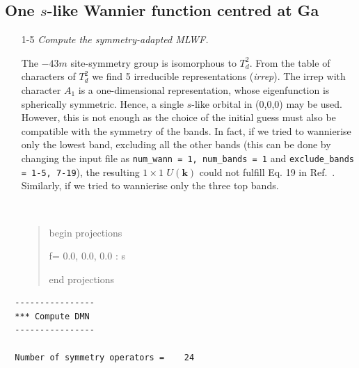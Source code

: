 \subsection*{One $s$-like Wannier function centred at Ga}
\begin{itemize}
	\item[1-5] {\it  Compute the symmetry-adapted MLWF.}

	The ${-}43m$ site-symmetry group is isomorphous to $T_d^2$. From the table of characters of $T_d^2$ we find 5 irreducible representations (\textit{irrep}). The irrep with character $A_1$ is a one-dimensional representation, whose eigenfunction is spherically symmetric. Hence, a single $s$-like orbital in (0,0,0) may be used. However, this is not enough as the choice of the initial guess must also be compatible with the symmetry of the bands. In fact, if we tried to wannierise only the lowest band, excluding all the other bands (this can be done by changing the input file as {\tt num\_wann = 1, num\_bands = 1} and {\tt exclude\_bands = 1-5, 7-19}), the resulting $1\times1$ $U(\mathbf{k})$ could not fulfill Eq. 19 in Ref.~. Similarly, if we tried to wannierise only the three top bands.
	{\tt
	\begin{quote}
	begin projections

	f= 0.0, 0.0, 0.0 : s

	end projections
	\end{quote}
	}
\end{itemize}

 	\begin{tcolorbox}[sharp corners,boxrule=0.5pt]
 	{\small
 	\begin{verbatim}
  ----------------
  *** Compute DMN
  ----------------

  Number of symmetry operators =    24
	\end{verbatim}
	}
	\end{tcolorbox}


